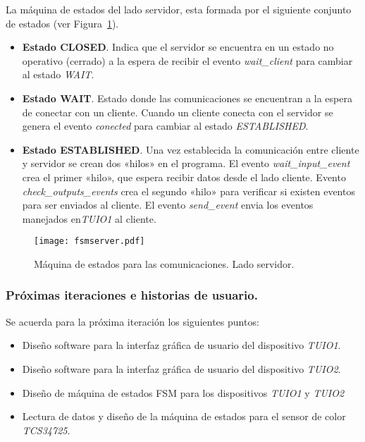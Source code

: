 La máquina de estados del lado servidor, esta formada por el siguiente conjunto de estados (ver Figura~\ref{fig:fsmserver}).\
\begin{itemize}
\item \textbf{Estado CLOSED}. Indica que el servidor se encuentra en un estado no operativo (cerrado) a la espera de recibir el evento \emph{wait\_client} para cambiar al estado \emph{WAIT}.
\item \textbf{Estado WAIT}. Estado donde las comunicaciones se encuentran a la espera de conectar con un cliente. Cuando un cliente conecta con el servidor se genera el evento \emph{conected} para cambiar al estado \emph{ESTABLISHED}.
\item \textbf{Estado ESTABLISHED}. Una vez establecida la comunicación entre cliente y servidor se crean dos «hilos» en el programa. El evento \emph{wait\_input\_event} crea el primer «hilo», que espera recibir datos desde el lado cliente. Evento \emph{check\_outputs\_events} crea el segundo «hilo» para verificar si existen eventos para ser enviados al cliente. El evento \emph{send\_event} envia los eventos manejados en\emph{TUIO1} al cliente.
\end{itemize}
\begin{figure}[!h]
\begin{center}
\texttt{[image: fsmserver.pdf]}
\caption{Máquina de estados para las comunicaciones. Lado servidor. }
\label{fig:fsmserver}
\end{center}
\end{figure}
\subsubsection{Próximas iteraciones e historias de usuario.}
Se acuerda para la próxima iteración los siguientes puntos:
\begin{itemize}
\item Diseño software para la interfaz gráfica de usuario del dispositivo \emph{TUIO1}.
\item Diseño software para la interfaz gráfica de usuario del dispositivo \emph{TUIO2}.
\item Diseño de máquina de estados FSM para los dispositivos \emph{TUIO1} y \emph{TUIO2}
\item Lectura de datos y diseño de la máquina de estados para el sensor de color \emph{TCS34725}.
\end{itemize}
